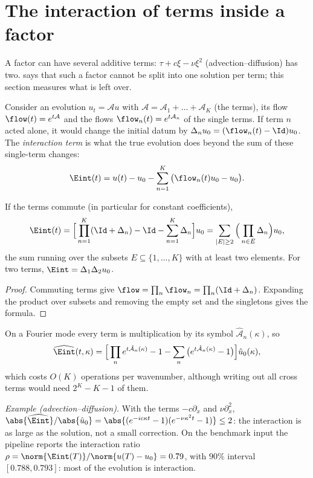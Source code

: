 \section{The interaction of terms inside a factor}\label{sm:interaction}
A factor can have several additive terms: $\tau+c\xi-\nu\xi^2$ (advection--diffusion) has two.  says
that such a factor cannot be split into one solution per term; this section measures what is left over.

Consider an evolution $u_t=\mathcal Au$ with $\mathcal A=\mathcal A_1+\dots+\mathcal A_K$ (the terms), its flow
$\flow(t)=e^{t\mathcal A}$ and the flows $\flow_n(t)=e^{t\mathcal A_n}$ of the single terms. If term $n$ acted alone, it
would change the initial datum by $\Delta_nu_0=(\flow_n(t)-\Id)u_0$. The \emph{interaction term} is what the true
evolution does beyond the sum of these single-term changes:
\begin{equation}\label{sm:eq:eint}
  \Eint(t)=u(t)-u_0-\sum_{n=1}^K\big(\flow_n(t)u_0-u_0\big).
\end{equation}
\begin{proposition}\label{sm:prop:eint}
If the terms commute (in particular for constant coefficients),
\[
  \Eint(t)=\Big[\prod_{n=1}^K(\Id+\Delta_n)-\Id-\sum_{n=1}^K\Delta_n\Big]u_0=\sum_{|E|\ge2}\Big(\prod_{n\in E}\Delta_n\Big)u_0 ,
\]
the sum running over the subsets $E\subseteq\{1,\dots,K\}$ with at least two elements. For two terms,
$\Eint=\Delta_1\Delta_2u_0$.
\end{proposition}
\begin{proof}
Commuting terms give $\flow=\prod_n\flow_n=\prod_n(\Id+\Delta_n)$. Expanding the product over subsets and removing the
empty set and the singletons gives the formula.
\end{proof}
On a Fourier mode every term is multiplication by its symbol $\hat{\mathcal A}_n(\kappa)$, so
\[
  \widehat{\Eint}(t,\kappa)=\Big[\prod_ne^{t\hat{\mathcal A}_n(\kappa)}-1-\sum_n\big(e^{t\hat{\mathcal A}_n(\kappa)}-1\big)\Big]\hat u_0(\kappa),
\]
which costs $O(K)$ operations per wavenumber, although writing out all cross terms would need $2^K-K-1$ of them.

\emph{Example (advection--diffusion).} With the terms $-c\partial_x$ and $\nu\partial_x^2$,
$\abs{\widehat{\Eint}}/\abs{\hat u_0}=\abs{(e^{-ic\kappa t}-1)(e^{-\nu\kappa^2t}-1)}\le2$: the interaction is as large as the
solution, not a small correction. On the benchmark input the pipeline reports the interaction ratio
$\rho=\norm{\Eint(T)}/\norm{u(T)-u_0}=0.79$, with $90\%$ interval $[0.788,0.793]$: most of the evolution is interaction.

